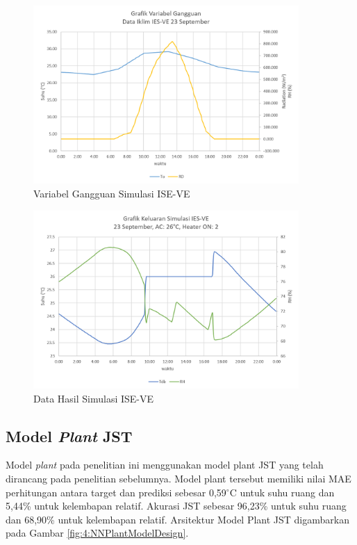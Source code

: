 \begin{figure}[!h]
	\centering
	\includegraphics[width=0.9\textwidth]{figures/LoadSimulasiIESVE}
	\caption{Variabel Gangguan Simulasi ISE-VE}
	\label{fig:4:LoadSimulasiIESVE}
\end{figure}
\vspace{1em}
\hfill\break

\begin{figure}[!h]
	\centering
	\includegraphics[width=0.9\textwidth]{figures/HasilSimulasiIESVE}
	\caption{Data Hasil Simulasi ISE-VE}
	\label{fig:4:HasilSimulasiIESVE}
\end{figure}
\vspace{1em}
\break

\subsection{Model \textit{Plant} JST}
Model \textit{plant} pada penelitian ini menggunakan model plant JST yang telah dirancang pada penelitian sebelumnya\cite{skripsiTanto}. Model plant tersebut memiliki nilai MAE perhitungan antara target dan prediksi sebesar 0,59$^{\circ}$C untuk suhu ruang dan 5,44\% untuk kelembapan relatif. Akurasi JST sebesar 96,23\% untuk suhu ruang dan 68,90\% untuk kelembapan relatif. Arsitektur Model Plant JST digambarkan pada Gambar \ref{fig:4:NNPlantModelDesign}.

